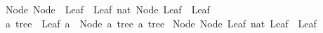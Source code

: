 \begin{isabellebody}
\isanewline
{}\isamarkupfalse%
\ {\isachardoublequoteopen}Node\ {\isacharparenleft}{\kern0pt}Node\ \ Leaf\ {}\ Leaf{\isacharparenright}{\kern0pt}\ {\isacharparenleft}{\kern0pt}{}{\isacharcolon}{\kern0pt}{\isacharcolon}{\kern0pt}nat{\isacharparenright}{\kern0pt}\ {\isacharparenleft}{\kern0pt}Node\ Leaf\ {}\ Leaf{\isacharparenright}{\kern0pt}{\isachardoublequoteclose}\isanewline
\isanewline
{}\isamarkupfalse%
\ {\isacharprime}{\kern0pt}a\ tree{\isacharprime}{\kern0pt}\ {\isacharequal}{\kern0pt}\ Leaf{\isacharprime}{\kern0pt}\ {\isacharprime}{\kern0pt}a\ {\isacharbar}{\kern0pt}\ Node{\isacharprime}{\kern0pt}\ {\isachardoublequoteopen}{\isacharprime}{\kern0pt}a\ tree{\isacharprime}{\kern0pt}{\isachardoublequoteclose}\ {\isachardoublequoteopen}{\isacharprime}{\kern0pt}a\ tree{\isacharprime}{\kern0pt}{\isachardoublequoteclose}\isanewline
\isanewline
{}\isamarkupfalse%
\ {\isachardoublequoteopen}Node{\isacharprime}{\kern0pt}\ {\isacharparenleft}{\kern0pt}Node{\isacharprime}{\kern0pt}\ {\isacharparenleft}{\kern0pt}Leaf{\isacharprime}{\kern0pt}\ {\isacharparenleft}{\kern0pt}{}{\isacharcolon}{\kern0pt}{\isacharcolon}{\kern0pt}nat{\isacharparenright}{\kern0pt}{\isacharparenright}{\kern0pt}\ {\isacharparenleft}{\kern0pt}Leaf{\isacharprime}{\kern0pt}\ {}{\isacharparenright}{\kern0pt}{\isacharparenright}{\kern0pt}\ {\isacharparenleft}{\kern0pt}Leaf{\isacharprime}{\kern0pt}\ {}{\isacharparenright}{\kern0pt}{\isachardoublequoteclose}\isanewline
%
\isadelimtheory
\isanewline
%
\endisadelimtheory
%
\isatagtheory
{}\isamarkupfalse%
%
\endisatagtheory
{\isafoldtheory}%
%
\isadelimtheory
%
\endisadelimtheory
%
\end{isabellebody}%
\endinput
